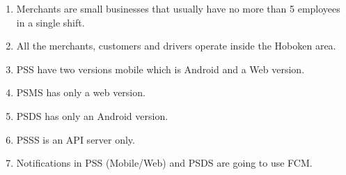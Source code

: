 \begin{enumerate}[resume, label=AS-\arabic*]
    \item Merchants are small businesses that usually have no more 
    than 5 employees in a single shift.
    \item All the merchants, customers and drivers operate inside the 
    Hoboken area.
    \pagebreak
    \item PSS have two versions mobile which is Android and a Web version.
    \item PSMS has only a web version.
    \item PSDS has only an Android version.
    \item PSSS is an API server only.
    \item Notifications in PSS (Mobile/Web) and PSDS are going to use FCM.
\end{enumerate}
\pagebreak
